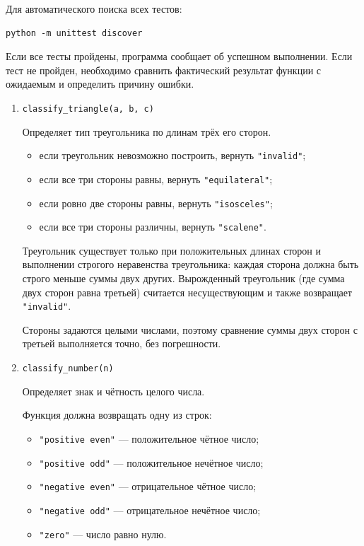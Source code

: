 Для автоматического поиска всех тестов:

\begin{verbatim}
python -m unittest discover
\end{verbatim}

Если все тесты пройдены, программа сообщает об успешном выполнении.
Если тест не пройден, необходимо сравнить фактический результат функции
с ожидаемым и определить причину ошибки.


\begin{enumerate}

\item \texttt{classify\_triangle(a, b, c)}

Определяет тип треугольника по длинам трёх его сторон.

\begin{itemize}
    \item если треугольник невозможно построить, вернуть \texttt{"invalid"};
    \item если все три стороны равны, вернуть \texttt{"equilateral"};
    \item если ровно две стороны равны, вернуть \texttt{"isosceles"};
    \item если все три стороны различны, вернуть \texttt{"scalene"}.
\end{itemize}

Треугольник существует только при положительных длинах сторон и выполнении
строгого неравенства треугольника: каждая сторона должна быть строго меньше
суммы двух других. Вырожденный треугольник (где сумма двух сторон равна
третьей) считается несуществующим и также возвращает \texttt{"invalid"}.

Стороны задаются целыми числами, поэтому сравнение суммы двух сторон
с третьей выполняется точно, без погрешности.

\item \texttt{classify\_number(n)}

Определяет знак и чётность целого числа.

Функция должна возвращать одну из строк:
\begin{itemize}
    \item \texttt{"positive even"} --- положительное чётное число;
    \item \texttt{"positive odd"} --- положительное нечётное число;
    \item \texttt{"negative even"} --- отрицательное чётное число;
    \item \texttt{"negative odd"} --- отрицательное нечётное число;
    \item \texttt{"zero"} --- число равно нулю.
\end{itemize}


\end{enumerate}
